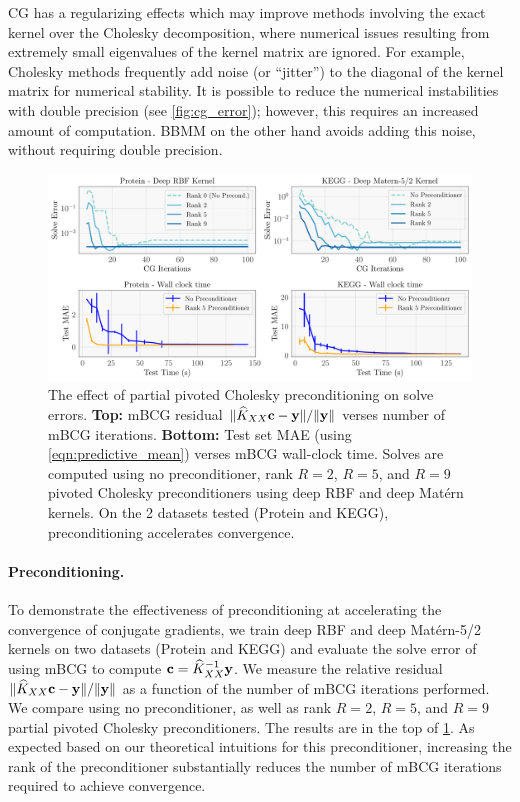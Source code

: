CG has a regularizing effects which may improve methods involving the exact kernel over the Cholesky decomposition, where numerical issues resulting from extremely small eigenvalues of the kernel matrix are ignored.
For example, Cholesky methods frequently add noise (or ``jitter'') to the diagonal of the kernel matrix for numerical stability.
It is possible to reduce the numerical instabilities with double precision (see \cref{fig:cg_error}); however, this requires an increased amount of computation.
BBMM on the other hand avoids adding this noise, without requiring double precision.

\begin{figure}[t]
  \centering
  \includegraphics[width=\textwidth]{figures/precond_solves}
  \caption[The effect of partial pivoted Cholesky preconditioning on mBCG solve errors.]{
    The effect of partial pivoted Cholesky preconditioning on solve errors.
		{\bf Top:} mBCG residual $\Vert \widehat{K}_{XX} \mathbf{c} - \mathbf{y} \Vert / \Vert \mathbf{y} \Vert$ verses number of mBCG iterations.
		{\bf Bottom:} Test set MAE (using \cref{eqn:predictive_mean}) verses mBCG wall-clock time.
		Solves are computed using no preconditioner, rank $R=2$, $R=5$, and $R=9$ pivoted Cholesky preconditioners using deep RBF and deep Mat\'ern kernels.
		On the 2 datasets tested (Protein and KEGG), preconditioning accelerates convergence.
  }
  \label{fig:precond_results}
\end{figure}

\paragraph{Preconditioning.}
To demonstrate the effectiveness of preconditioning at accelerating the convergence of conjugate gradients,
we train deep RBF and deep Mat\'ern-5/2 kernels on two datasets (Protein and KEGG) and evaluate the solve error of using mBCG to compute $\mathbf{c} = \widehat{K}_{XX}^{-1}\mathbf{y}$.
We measure the relative residual $\Vert \widehat{K}_{XX}\mathbf{c} - \mathbf{y} \Vert / \Vert \mathbf{y} \Vert$ as a function of the number of mBCG iterations performed.
We compare using no preconditioner, as well as rank $R=2$, $R=5$, and $R=9$ partial pivoted Cholesky preconditioners.
The results are in the top of \cref{fig:precond_results}.
As expected based on our theoretical intuitions for this preconditioner, increasing the rank of the preconditioner substantially reduces the number of mBCG iterations required to achieve convergence.

